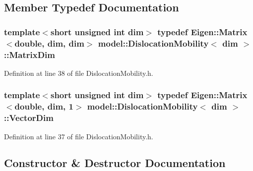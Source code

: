 \subsection{Member Typedef Documentation}
\hypertarget{classmodel_1_1_dislocation_mobility_a7b0acb89b305f6b042fbcd1b6fd9a06a}{}
\subsubsection[{Matrix\+Dim}]{\setlength{\rightskip}{0pt plus 5cm}template$<$short unsigned int dim$>$ typedef Eigen\+::\+Matrix$<$double, {\bf dim}, {\bf dim}$>$ {\bf model\+::\+Dislocation\+Mobility}$<$ {\bf dim} $>$\+::{\bf Matrix\+Dim}}\label{classmodel_1_1_dislocation_mobility_a7b0acb89b305f6b042fbcd1b6fd9a06a}


Definition at line 38 of file Dislocation\+Mobility.\+h.

\hypertarget{classmodel_1_1_dislocation_mobility_add1b850a21bdb55ae123917bf02022d0}{}
\subsubsection[{Vector\+Dim}]{\setlength{\rightskip}{0pt plus 5cm}template$<$short unsigned int dim$>$ typedef Eigen\+::\+Matrix$<$double, {\bf dim}, 1$>$ {\bf model\+::\+Dislocation\+Mobility}$<$ {\bf dim} $>$\+::{\bf Vector\+Dim}}\label{classmodel_1_1_dislocation_mobility_add1b850a21bdb55ae123917bf02022d0}


Definition at line 37 of file Dislocation\+Mobility.\+h.



\subsection{Constructor \& Destructor Documentation}
\hypertarget{classmodel_1_1_dislocation_mobility_a22439d926c3be7dc7e303102d080c596}{}
